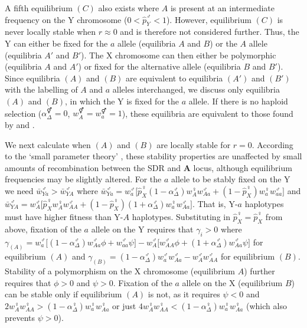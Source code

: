 \documentclass[12pt]{article}
\begin{document}
\noindent
A fifth equilibrium $(C)$ also exists where $A$ is present at an intermediate frequency on the Y chromosome ($0<\hat{p}_{Y}^{\male}<1$). However, equilibrium $(C)$ is never locally stable when $r \approx 0$ and is therefore not considered further. 
Thus, the Y can either be fixed for the $a$ allele (equilibria $A$ and $B$) or the $A$ allele (equilibria $A'$ and $B'$).
The X chromosome can then either be polymorphic (equilibria $A$ and $A'$) or fixed for the alternative allele (equilibria $B$ and $B'$).
Since equilibria $(A)$ and $(B)$ are equivalent to equilibria $(A')$ and $(B')$ with the labelling of $A$ and $a$ alleles interchanged, we discuss only equilibria $(A)$ and $(B)$, in which the Y is fixed for the $a$ allele. 
If there is no haploid selection ($\alpha^{\Hermaphrodite}_\Delta=0$, $w_{A}^{\Hermaphrodite}=w_{a}^{\Hermaphrodite}=1$), these equilibria are equivalent to those found by \cite{Lloyd1977} and \cite{Otto2014}.

We next calculate when $(A)$ and $(B)$ are locally stable for $r=0$. 
According to the `small parameter theory' \citep{Karlin:1972ab,Karlin:1972dq}, these stability properties are unaffected by small amounts of recombination between the SDR and \textbf{A} locus, although equilibrium frequencies may be slightly altered. 
For the $a$ allele to be stably fixed on the Y we need $\bar{w}_{Ya}^{\male} > \bar{w}_{YA}^{\male}$ where $\bar{w}_{Ya}^{\male} = w_{a}^{\male} \big[\hat{p}_X^\female(1-\alpha^\male_\Delta) w_{A}^{\female} w_{Aa}^{\male} + (1-\hat{p}_X^\female)w_{a}^{\female} w_{aa}^{\male} \big]$ and $\bar{w}_{YA}^{\male} = w_{A}^{\male} \big[ \hat{p}_X^\female w_{A}^{\female} w_{AA}^{\male} + (1-\hat{p}_X^\female)(1+\alpha^\male_\Delta) w_{a}^{\female} w_{Aa}^{\male} \big]$. 
That is, Y-$a$ haplotypes must have higher fitness than Y-$A$ haplotypes.  
Substituting in $\hat{p}_X^\female = \hat{p}_{X}^{\female}$ from above, fixation of the $a$ allele on the Y requires that $\gamma_{i}>0$ where $\gamma_{(A)}=w_{a}^{\male} \big[ (1-\alpha^\male_\Delta) w_{Aa}^{\male} \phi + w_{aa}^{\male} \psi \big]-w_{A}^{\male} \big[ w_{AA}^{\male} \phi + (1 + \alpha^{\male}_\Delta)w_{Aa}^{\male} \psi \big]$ for equilibrium $(A)$ and $\gamma_{(B)}=(1-\alpha^{\male}_\Delta)w_{a}^{\male}w_{Aa}^{\male}-w_{A}^{\male}w_{AA}^{\male}$ for equilibrium $(B)$.
Stability of a polymorphism on the X chromosome (equilibrium $A$) further requires that $\phi >0$ and $\psi >0$. 
Fixation of the $a$ allele on the X (equilibrium $B$) can be stable only if equilibrium $(A)$ is not, as it requires $\psi<0$ and $2w_{A}^{\female}w_{AA}^{\female}>(1-\alpha_\Delta^{\female})w_{a}^{\female}w_{Aa}^{\female}$ or just $4w_{A}^{\female}w_{AA}^{\female}<(1-\alpha_\Delta^{\female})w_{a}^{\female}w_{Aa}^{\female}$ (which also prevents $\psi>0$). 
\end{document}
